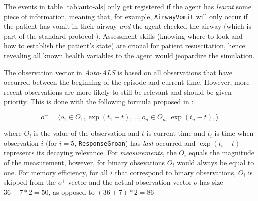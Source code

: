     
The events in table \ref{tab:auto-als} only get registered if the agent has \emph{learnt} some piece of information, meaning that, for example, \verb|AirwayVomit| will only occur if the patient has vomit in their airway \emph{and} the agent checked the airway (which is part of the standard protocol \cite{abcde}).
Assessment skills (knowing where to look and how to establish the patient's state) are crucial for patient resuscitation, hence revealing all known health variables to the agent would jeopardize the simulation.


The observation vector in \emph{Auto-ALS} is based on all observations that have occurred between the beginning of the episode and current time.
However, more recent observations are more likely to still be relevant and should be given priority.
This is done with the following formula proposed in \cite{liventsevReinforcementLearningMessage2021}:

\begin{equation}
     o^{+} = \langle o_1 \in O_1, \exp(t_1-t), \dots, o_n \in O_n, \exp(t_n-t), \rangle
\end{equation}

where $O_i$ is the value of the observation and $t$ is current time and $t_i$ is time when observation $i$ (for $i=5$, \verb|ResponseGroan|) has \emph{last} occurred and $\exp(t_i-t)$ represents its decaying relevance.
For \emph{measurements}, the $O_i$ equals the magnitude of the measurement, however, for binary obsevations $O_i$ would always be equal to one.
For memory efficiency, for all $i$ that correspond to binary observations, $O_i$ is skipped from the $o^{+} $ vector and the actual observation vector $o$ has size $36+7*2=50$, as opposed to $(36+7)*2=86$